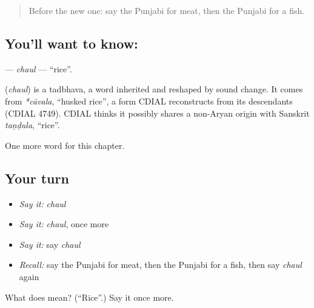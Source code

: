 \label{lesson:PA-C63-chaul}



\begin{quote}
Before the new one: say the Punjabi for meat, then the Punjabi for a fish.
\end{quote}

\subsection*{You'll want to know: }
\textbf{} — \emph{chaul} — \textquotedblleft{}rice\textquotedblright{}.

\begin{cousinweb}
\textbf{} (\emph{chaul}) is a tadbhava, a word inherited and reshaped by sound change. It comes from \emph{*cāvala}, \textquotedblleft{}husked rice\textquotedblright{}, a form CDIAL reconstructs from its descendants (CDIAL 4749). CDIAL thinks it possibly shares a non-Aryan origin with Sanskrit \emph{taṇḍula}, \textquotedblleft{}rice\textquotedblright{}.
\end{cousinweb}

\begin{grammarlens}[title={What you've built}]
One more word for this chapter.
\end{grammarlens}

\subsection*{Your turn}
\begin{itemize}
\raggedright
  \item \emph{Say it:} \emph{chaul}
  \item \emph{Say it:} \emph{chaul}, once more
  \item \emph{Say it:} say \emph{chaul}
  \item \emph{Recall:} say the Punjabi for meat, then the Punjabi for a fish, then say \emph{chaul} again
\end{itemize}

\begin{tcolorbox}[breakable,colback=teal!4,colframe=teal!35!black,title={Before you move on}]
What does  mean? (\textquotedblleft{}Rice\textquotedblright{}.) Say it once more.
\end{tcolorbox}
